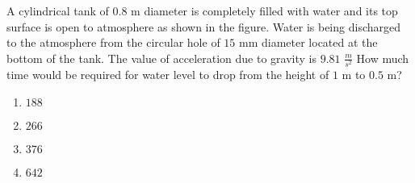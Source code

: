     \item A cylindrical tank of $0.8$ m diameter is completely filled with water and its top surface is open to atmosphere as shown in the figure. Water is being discharged to the atmosphere from the circular hole of $15$ mm diameter located at the bottom of the tank. The value of acceleration due to gravity is $9.81$ $\frac{m}{s^2}$ How much time  would be required for water level to drop from the height of $1$ m to $0.5$ m?\\

    \begin{enumerate}
        \item $188$
        \item $266$
        \item $376$
        \item $642$
    \end{enumerate}
